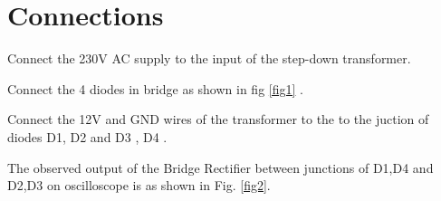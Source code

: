 \documentclass[journal,12pt,twocolumn]{IEEEtran}
\begin{document}
\section{Connections}
\begin{problem}
Connect the 230V AC supply to the input of the step-down transformer.
\end{problem}
\begin{problem}
Connect the 4 diodes in bridge as shown in fig \ref{fig1} .
\end{problem}
\begin{problem}
Connect the 12V and GND wires of the transformer to the to the juction of diodes D1, D2 and D3 , D4 .
\end{problem}

\begin{problem}
The observed output of the Bridge Rectifier between junctions of D1,D4 and D2,D3 on  oscilloscope is as shown in Fig. \ref{fig2}.
\end{problem}
\end{document}
